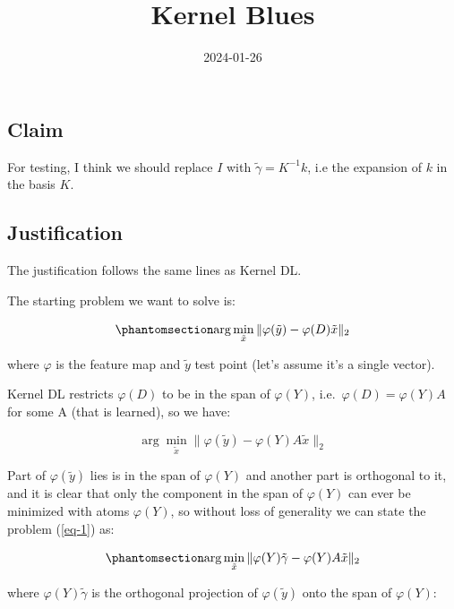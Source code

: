 \documentclass[
  letterpaper,
  DIV=11,
  numbers=noendperiod]{scrartcl}
\title{Kernel Blues}
\author{}
\date{2024-01-26}
\renewcommand*\contentsname{Table of contents}
\newcommand\contentsname{Table of contents}
\begin{document}
\maketitle

\renewcommand*\contentsname{Table of contents}
{
\hypersetup{linkcolor=}
\setcounter{tocdepth}{3}
\tableofcontents
}

\subsection{Claim}\label{claim}

For testing, I think we should replace \(I\) with
\(\tilde{\gamma} = K^{-1} k\), i.e the expansion of \(k\) in the basis
\(K\).

\subsection{Justification}\label{justification}

The justification follows the same lines as Kernel DL.

The starting problem we want to solve is:

\begin{equation}\phantomsection\label{eq-1}{\arg\min_{\tilde{x}} \|\varphi(\tilde{y}) - \varphi(D) \tilde{x}\|_2}\end{equation}

where \(\varphi\) is the feature map and \(\tilde{y}\) test point (let's
assume it's a single vector).

Kernel DL restricts \(\varphi(D)\) to be in the span of \(\varphi(Y)\),
i.e.~\(\varphi(D) = \varphi(Y) A\) for some A (that is learned), so we
have:

\[\arg\min_{\tilde{x}} \|\varphi(\tilde{y}) - \varphi(Y) A \tilde{x}\|_2\]

Part of \(\varphi(\tilde{y})\) lies is in the span of \(\varphi(Y)\) and
another part is orthogonal to it, and it is clear that only the
component in the span of \(\varphi(Y)\) can ever be minimized with atoms
\(\varphi(Y)\), so without loss of generality we can state the problem
(\ref{eq-1}) as:

\begin{equation}\phantomsection\label{eq-2}{\arg\min_{\tilde{x}} \|\varphi(Y) \tilde{\gamma} - \varphi(Y) A \tilde{x}\|_2}\end{equation}

where \(\varphi(Y)\tilde{\gamma}\) is the orthogonal projection of
\(\varphi(\tilde{y})\) onto the span of \(\varphi(Y)\):
\end{document}
